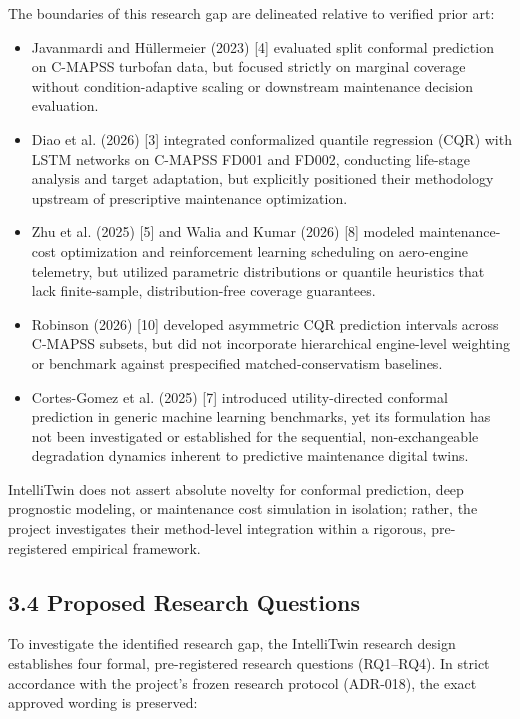 \documentclass[12pt,a4paper]{article}
\begin{document}
The boundaries of this research gap are delineated relative to verified prior art:
\begin{itemize}
    \item Javanmardi and H{\"u}llermeier (2023) [4] evaluated split conformal prediction on C-MAPSS turbofan data, but focused strictly on marginal coverage without condition-adaptive scaling or downstream maintenance decision evaluation.
    \item Diao et al. (2026) [3] integrated conformalized quantile regression (CQR) with LSTM networks on C-MAPSS FD001 and FD002, conducting life-stage analysis and target adaptation, but explicitly positioned their methodology upstream of prescriptive maintenance optimization.
    \item Zhu et al. (2025) [5] and Walia and Kumar (2026) [8] modeled maintenance-cost optimization and reinforcement learning scheduling on aero-engine telemetry, but utilized parametric distributions or quantile heuristics that lack finite-sample, distribution-free coverage guarantees.
    \item Robinson (2026) [10] developed asymmetric CQR prediction intervals across C-MAPSS subsets, but did not incorporate hierarchical engine-level weighting or benchmark against prespecified matched-conservatism baselines.
    \item Cortes-Gomez et al. (2025) [7] introduced utility-directed conformal prediction in generic machine learning benchmarks, yet its formulation has not been investigated or established for the sequential, non-exchangeable degradation dynamics inherent to predictive maintenance digital twins.
\end{itemize}
IntelliTwin does not assert absolute novelty for conformal prediction, deep prognostic modeling, or maintenance cost simulation in isolation; rather, the project investigates their method-level integration within a rigorous, pre-registered empirical framework.

\subsection*{3.4 Proposed Research Questions}
To investigate the identified research gap, the IntelliTwin research design establishes four formal, pre-registered research questions (RQ1--RQ4). In strict accordance with the project's frozen research protocol (ADR-018), the exact approved wording is preserved:
\end{document}
